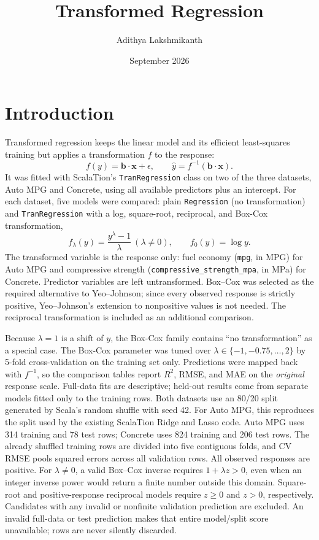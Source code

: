 \documentclass{article}
\title{Transformed Regression}
\author{Adithya Lakshmikanth}
\date{September 2026}
\begin{document}
\maketitle

\section{Introduction}

Transformed regression keeps the linear model and its efficient least-squares training but applies a transformation $f$ to the response:
\[
f(y) = \mathbf{b}\cdot\mathbf{x} + \epsilon, \qquad \hat{y} = f^{-1}(\mathbf{b}\cdot\mathbf{x}).
\]
It was fitted with ScalaTion's \texttt{TranRegression} class on two of the three datasets, Auto MPG and Concrete, using all available predictors plus an intercept. For each dataset, five models were compared: plain \texttt{Regression} (no transformation) and \texttt{TranRegression} with a log, square-root, reciprocal, and Box-Cox transformation,
\[
f_\lambda(y) = \frac{y^{\lambda}-1}{\lambda}\ (\lambda \neq 0), \qquad f_0(y) = \log y .
\]
The transformed variable is the response only: fuel economy (\texttt{mpg}, in MPG) for Auto MPG and compressive strength (\texttt{compressive\_strength\_mpa}, in MPa) for Concrete. Predictor variables are left untransformed. Box--Cox was selected as the required alternative to Yeo--Johnson; since every observed response is strictly positive, Yeo--Johnson's extension to nonpositive values is not needed. The reciprocal transformation is included as an additional comparison.

Because $\lambda = 1$ is a shift of $y$, the Box-Cox family contains ``no transformation'' as a special case. The Box-Cox parameter was tuned over $\lambda \in \{-1, -0.75, \dots, 2\}$ by 5-fold cross-validation on the training set only. Predictions were mapped back with $f^{-1}$, so the comparison tables report $R^2$, RMSE, and MAE on the \emph{original} response scale. Full-data fits are descriptive; held-out results come from separate models fitted only to the training rows. Both datasets use an 80/20 split generated by Scala's random shuffle with seed 42. For Auto MPG, this reproduces the split used by the existing ScalaTion Ridge and Lasso code. Auto MPG uses 314 training and 78 test rows; Concrete uses 824 training and 206 test rows. The already shuffled training rows are divided into five contiguous folds, and CV RMSE pools squared errors across all validation rows. All observed responses are positive. For $\lambda\ne0$, a valid Box--Cox inverse requires $1+\lambda z>0$, even when an integer inverse power would return a finite number outside this domain. Square-root and positive-response reciprocal models require $z\geq0$ and $z>0$, respectively. Candidates with any invalid or nonfinite validation prediction are excluded. An invalid full-data or test prediction makes that entire model/split score unavailable; rows are never silently discarded.
\end{document}
